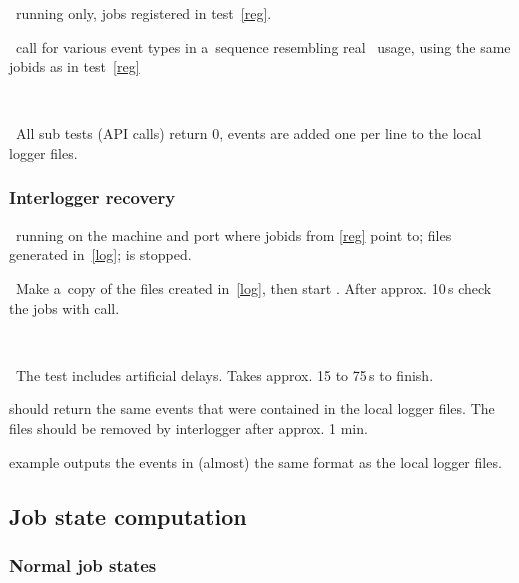 \req\ running  only, jobs registered in test~\ref{reg}.

\what\ call  for various event types in a~sequence
resembling real \LB\ usage, using the same jobids as in test~\ref{reg}

\how\ 

\result\ All sub tests (API calls) return 0, events are added one per line to the local logger files.



\subsubsection{Interlogger recovery}
\label{recover}

\req\ running  on the machine and port where
jobids from \ref{reg} point to; files generated in~\ref{log};
 is stopped.

\what\ Make a~copy of the files created in~\ref{log}, then start
. After approx. 10\,s check the jobs
with  call.

\how\ 

\note\ The test includes artificial delays. Takes approx. 15 to 75\,s to finish.

\result {} should return the same events that were
contained in the local logger files. The files should be removed by
interlogger after approx. 1 min.

\begin{hints}
 example outputs the events in (almost) the same
format as the local logger files.
\end{hints}




\subsection{Job state computation}

\subsubsection{Normal job states}
\label{state}

